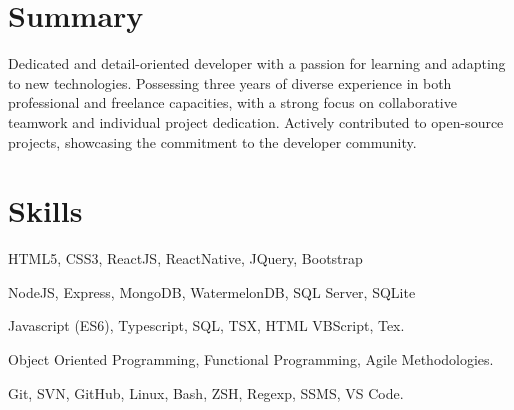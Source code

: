 \documentclass[a4paper,10pt]{article}
\begin{document}

\fancyhead[C]{
}


\section{Summary}
\sloppy
Dedicated and detail-oriented developer with a passion for learning and
adapting to new technologies. Possessing three years of diverse experience in both professional and freelance capacities,
with a strong focus on collaborative teamwork and individual project dedication.
Actively contributed to open-source projects, showcasing the commitment to the developer community.

\section{Skills}

\begin{description}
    \setlength\itemsep{0.1pt}
    \item[Front End:] HTML5, CSS3, ReactJS, ReactNative, JQuery, Bootstrap
    \item[Back End:] NodeJS, Express, MongoDB, WatermelonDB, SQL Server, SQLite
    \item[Languages:] Javascript (ES6), Typescript, SQL, TSX, HTML VBScript, Tex.
    \item[Concepts:] Object Oriented Programming, Functional Programming, Agile Methodologies.
    \item[Miscellaneous:] Git, SVN, GitHub, Linux, Bash, ZSH, Regexp, SSMS, VS Code.
\end{description}
\end{document}
